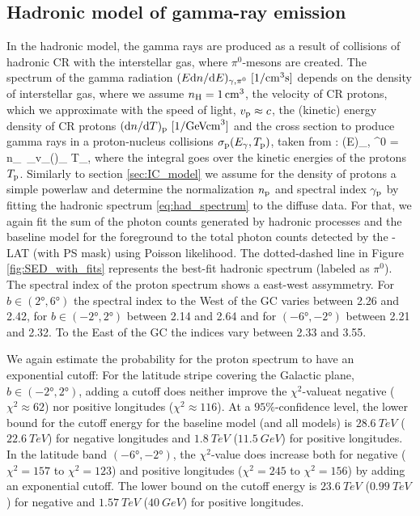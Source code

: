 \subsection{Hadronic model of gamma-ray emission}
\label{sec:Pion_model}

In the hadronic model, the gamma rays are produced as a result of collisions of hadronic CR with the interstellar gas, where $\pi^0$-mesons are created.
The spectrum of the gamma radiation $(E \de n / \de E)_{\gamma,\pi^0}\ [\SI{}{1/cm^3s}]$ depends on the density of interstellar gas, where we assume $n_{\text{H}} = \SI{1}{/cm^3}$, the velocity of CR protons, which we approximate with the speed of light, $v_{\text{p}} \approx c$, the (kinetic) energy density of CR protons $(\text{d} n / \text{d} T)_{\text{p}}\ [\SI{}{1/GeVcm^3}]$ and the cross section to produce gamma rays in a proton-nucleus collisions $\sigma_{\text{p}} (E_\gamma, T_{\text{p}})$, taken from :
\be
\left(E\right)_{\!\!\gamma, \pi^0}\! = \int n_\Hy\ \sigma_\pr v_\pr \left(\right)_{\!\!\pr} \de T_\pr,
\label{eq:had_spectrum}
\ee
where the integral goes over the kinetic energies of the protons $T_{\text{p}}$. Similarly to section \ref{sec:IC_model} we assume for the density of protons a simple powerlaw and determine the normalization $n_{\text{p}}$ and spectral index $\gamma_{\text{p}}$  by fitting the hadronic spectrum \eqref{eq:had_spectrum} to the diffuse \Fermi data. For that, we again fit the sum of the photon counts generated by hadronic processes and the baseline model for the foreground to the total photon counts detected by the \Fermi-LAT (with PS mask) using Poisson likelihood.  The dotted-dashed line in Figure \ref{fig:SED_with_fits} represents the best-fit hadronic spectrum (labeled as $\pi^0$). The spectral index of the proton spectrum shows a east-west assymmetry. For $b \in (\ang{2}, \ang{6})$ the spectral index to the West of the GC varies between 2.26 and 2.42, for $b \in (-\ang{2}, \ang{2})$ between 2.14 and 2.64 and for $(-\ang{6}, -\ang{2})$ between 2.21 and 2.32. To the East of the GC the indices vary between 2.33 and 3.55. 

We again estimate the probability for the proton spectrum to have an exponential cutoff: For the latitude stripe covering the Galactic plane, $b \in (-\ang{2}, \ang{2})$, adding a cutoff does neither improve the $\chi^2$-valueat negative ($\chi^2 \approx 62$) nor positive longitudes ($\chi^2 \approx 116$). At a $95\%$-confidence level, the lower bound for the cutoff energy for the baseline model (and all models) is $\SI{28.6}{TeV}$ ($\SI{22.6}{TeV}$) for negative longitudes and $\SI{1.8}{TeV}$ ($\SI{11.5}{GeV}$) for positive longitudes.\\
In the latitude band $(-\ang{6}, -\ang{2})$, the $\chi^2$-value does increase both for negative ($\chi^2 = 157$ to $\chi^2 = 123$) and positive longitudes ($\chi^2 = 245$ to $\chi^2 = 156$) by adding an exponential cutoff. The lower bound on the cutoff energy is $\SI{23.6}{TeV}$ ($\SI{0.99}{TeV}$) for negative and $\SI{1.57}{TeV}$ ($\SI{40}{GeV}$) for positive longitudes.

